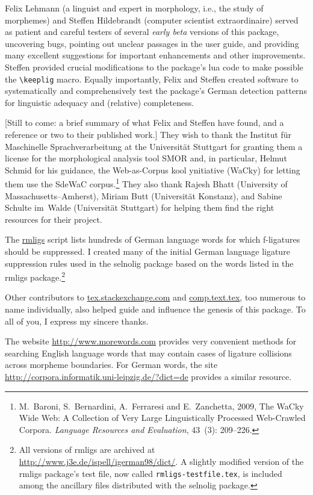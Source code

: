 \documentclass[12pt]{article}
\newcommand{\pkg}[1]{\textsf{#1}}
\newcommand{\opt}[1]{\texttt{#1}}
\newcommand{\cmmd}[1]{\texttt{\textbackslash #1}}
\begin{document}
Felix Lehmann (a linguist and expert in morphology, i.e., the study of morphemes) and Steffen Hildebrandt (computer scientist extraordinaire) served as patient and careful testers of several \emph{early beta} versions of this package, uncovering bugs, pointing out unclear passages in the user guide, and providing many excellent suggestions for important enhancements and other improvements. Steffen provided crucial modifications to the package's lua code to make possible the \cmmd{keeplig} macro. Equally importantly, Felix and Steffen created software to systematically and comprehensively test the package's German detection patterns for linguistic adequacy and (relative) completeness.

[Still to come: a brief summary of what Felix and Steffen have found, and a reference or two to their published work.] They wish to thank the Institut für Maschinelle Sprachverarbeitung at the Universität Stuttgart for granting them a license for the morphological analysis tool SMOR and, in particular, Helmut Schmid for his guidance, the Web-as-Corpus kool ynitiative (WaCky) for letting them use the SdeWaC corpus.\footnote{M.~Baroni, S.~Bernardini, A.~Ferraresi and E.~Zanchetta, 2009, The WaCky Wide Web: A Collection of Very Large Linguistically Processed Web-Crawled Corpora. \emph{Language Resources and Evaluation}, 43~(3): 209--226.} They also thank Rajesh Bhatt (University of Massachusetts--Amherst), Miriam Butt (Universität Konstanz), and Sabine Schulte im~Walde (Universität Stuttgart) for helping them find the right resources for their project.

The \href{http://www.ctan.org/tex-archive/support/rmligs}{\pkg{rmligs}} script lists hundreds of German language words for which f\nobreak-liga\-tures should be suppressed. I created many of the initial German language ligature suppression rules used in the \pkg{selnolig} package based on the words listed in the \pkg{rmligs} package.\footnote{All versions of \pkg{rmligs} are archived at \url{http://www.j3e.de/ispell/igerman98/dict/}. A slightly modified version of the \pkg{rmligs} package's test file, now called \opt{rmligs-testfile.tex}, is included among the ancillary files distributed with the \pkg{selnolig} package.} 

Other contributors to \url{tex.stackexchange.com} and \url{comp.text.tex}, too numerous to name individually, also helped guide and influence the genesis of this package. To all of you, I express my sincere thanks.

The website \url{http://www.morewords.com} provides very convenient methods for searching English language words that may contain cases of ligature collisions across morpheme boundaries. For German words, the site  \url{http://corpora.informatik.uni-leipzig.de/?dict=de} provides a similar resource. 
\end{document}
